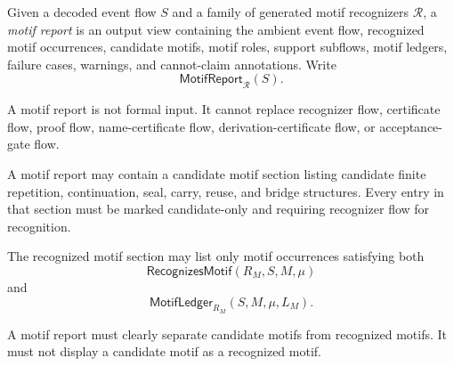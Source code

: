 \begin{definition}
\label{def:motif-report-report}
Given a decoded event flow $S$ and a family of generated motif recognizers $\mathcal R$, a \emph{motif report} is an output view containing the ambient event flow, recognized motif occurrences, candidate motifs, motif roles, support subflows, motif ledgers, failure cases, warnings, and cannot-claim annotations. Write
$$
  \mathsf{MotifReport}_{\mathcal R}(S).
$$
\end{definition}

\begin{principle}
\label{prin:motif-report-output-not-input}
A motif report is not formal input. It cannot replace recognizer flow, certificate flow, proof flow, name-certificate flow, derivation-certificate flow, or acceptance-gate flow.
\end{principle}

\begin{definition}
\label{def:motif-report-candidate-section}
A motif report may contain a candidate motif section listing candidate finite repetition, continuation, seal, carry, reuse, and bridge structures. Every entry in that section must be marked candidate-only and requiring recognizer flow for recognition.
\end{definition}

\begin{definition}
\label{def:motif-report-recognized-section}
The recognized motif section may list only motif occurrences satisfying both
$$
  \mathsf{RecognizesMotif}(R_M,S,M,\mu)
$$
and
$$
  \mathsf{MotifLedger}_{R_M}(S,M,\mu,L_M).
$$
\end{definition}

\begin{principle}
\label{prin:motif-report-candidate-recognized-separate}
A motif report must clearly separate candidate motifs from recognized motifs. It must not display a candidate motif as a recognized motif.
\end{principle}

